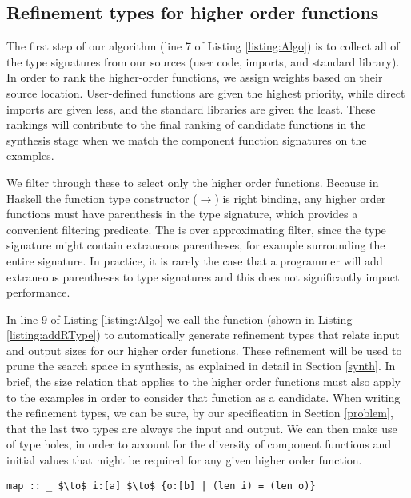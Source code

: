\subsection{Refinement types for higher order functions}\label{HORtypeInf}

The first step of our algorithm (line 7 of Listing \ref{listing:Algo}) is to collect all of the type signatures from our sources (user code, imports, and standard library). In order to rank the higher-order functions, we assign weights based on their source location. User-defined functions are given the highest priority, while direct imports are given less, and the standard libraries are given the least. These rankings will contribute to the final ranking of candidate functions in the synthesis stage when we match the component function signatures on the examples.

We filter through these to select only the higher order functions. Because in Haskell the function type constructor ($\to$) is right binding, any higher order functions must have parenthesis in the type signature, which provides a convenient filtering predicate. The is over approximating filter, since the type signature might contain extraneous parentheses, for example surrounding the entire signature. In practice, it is rarely the case that a programmer will add extraneous parentheses to type signatures and this does not significantly impact performance.

In line 9 of Listing \ref{listing:Algo} we call the  function (shown in Listing \ref{listing:addRType}) to automatically generate refinement types that relate input and output sizes for our higher order functions.
These refinement will be used to prune the search space in synthesis, as explained in detail in Section \ref{synth}.
In brief, the size relation that applies to the higher order functions must also apply to the examples in order to consider that function as a candidate.
When writing the refinement types, we can be sure, by our specification in Section \ref{problem}, that the last two types are always the input and output.
We can then make use of type holes, in order to account for the diversity of component functions and initial values that might be required for any given higher order function.

\begin{lstlisting}[numbers=none]
map :: _ $\to$ i:[a] $\to$ {o:[b] | (len i) = (len o)}
\end{lstlisting}

